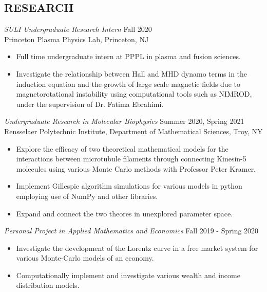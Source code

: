 \documentclass[margin]{rpires}
\begin{document}
\begin{resume}
\section{RESEARCH}      
    {\sl SULI Undergraduate Research Intern} \hfill Fall 2020 \\
    Princeton Plasma Physics Lab, 
    Princeton, NJ 
    \begin{itemize}  \itemsep -2pt %
    \item Full time undergraduate intern at PPPL in plasma and fusion sciences.
    \item   Investigate the relationship between Hall and MHD dynamo terms in the induction equation and the growth of large scale magnetic fields due to magnetorotational instability using computational tools such as NIMROD, under the supervision of Dr. Fatima Ebrahimi. 
    \end{itemize}

    {\sl Undergraduate Research in Molecular Biophysics} \hfill Summer 2020, Spring 2021 \\
    Rensselaer Polytechnic Institute, 
    Department of Mathematical Sciences, Troy, NY 
    \begin{itemize}  \itemsep -2pt %
    \item Explore the efficacy of two theoretical mathematical models for the interactions between microtubule filaments through connecting
    Kinesin-5 molecules using various Monte Carlo methods with Professor Peter Kramer.
    \item Implement Gillespie algorithm simulations for various models in python employing use of NumPy and other libraries. 
    \item   Expand and connect the two theores in unexplored parameter space.
    \end{itemize}

    {\sl Personal Project in Applied Mathematics and Economics} \hfill Fall 2019 - Spring 2020
    \begin{itemize}  \itemsep -2pt %
        \item Investigate the development of the Lorentz curve in a free market system for various Monte-Carlo models of an economy.
        \item Computationally implement and investigate various wealth and income distribution models.
    \end{itemize}


\end{resume}
\end{document}

